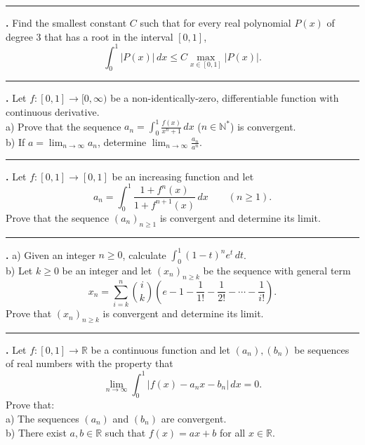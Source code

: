 \documentclass[11pt]{article}
\newcounter{probnum}
\newenvironment{problembox}{\par\noindent\rule{\linewidth}{0.5pt}\vspace{5pt}\par}{\vspace{2pt}}
\begin{document}
\begin{problembox}
\textbf{\theprobnum.} Find the smallest constant $C$ such that for every real polynomial $P(x)$ of degree $3$ that has a root in the interval $[0,1]$,
\[
\int_0^1 |P(x)|\,dx \le C \max_{x \in [0,1]} |P(x)|.
\]
\end{problembox}

\begin{problembox}
\textbf{\theprobnum.} Let $f : [0,1] \to [0,\infty)$ be a non-identically-zero, differentiable function with continuous derivative.\\
a) Prove that the sequence $a_n = \displaystyle\int_0^1 \frac{f(x)}{x^n+1}\,dx$ ($n \in \mathbb{N}^*$) is convergent.\\
b) If $a = \lim_{n \to \infty} a_n$, determine $\displaystyle\lim_{n \to \infty} \frac{a_n}{a^n}$.
\end{problembox}

\begin{problembox}
\textbf{\theprobnum.} Let $f : [0,1] \to [0,1]$ be an increasing function and let
\[
a_n = \int_0^1 \frac{1+f^n(x)}{1+f^{n+1}(x)}\,dx \qquad (n \ge 1).
\]
Prove that the sequence $(a_n)_{n \ge 1}$ is convergent and determine its limit.
\end{problembox}

\begin{problembox}
\textbf{\theprobnum.} a) Given an integer $n \ge 0$, calculate $\displaystyle\int_0^1 (1-t)^n e^t\,dt$.\\
b) Let $k \ge 0$ be an integer and let $(x_n)_{n \ge k}$ be the sequence with general term
\[
x_n = \sum_{i=k}^{n} \binom{i}{k} \left(e - 1 - \frac{1}{1!} - \frac{1}{2!} - \cdots - \frac{1}{i!}\right).
\]
Prove that $(x_n)_{n \ge k}$ is convergent and determine its limit.
\end{problembox}

\begin{problembox}
\textbf{\theprobnum.} Let $f : [0,1] \to \mathbb{R}$ be a continuous function and let $(a_n), (b_n)$ be sequences of real numbers with the property that
\[
\lim_{n \to \infty} \int_0^1 |f(x) - a_n x - b_n|\,dx = 0.
\]
Prove that:\\
a) The sequences $(a_n)$ and $(b_n)$ are convergent.\\
b) There exist $a, b \in \mathbb{R}$ such that $f(x) = ax+b$ for all $x \in \mathbb{R}$.
\end{problembox}
\end{document}
